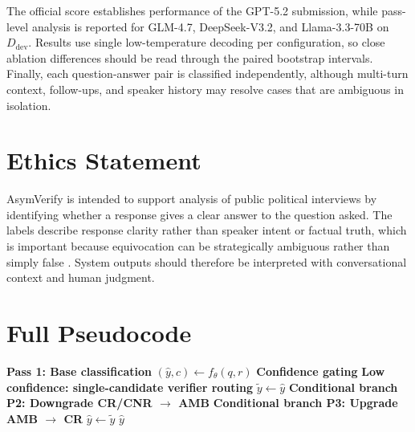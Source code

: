\documentclass[11pt]{article}
\newif\ifincludesupplement
\begin{document}
The official score establishes performance of the GPT-5.2 submission, while pass-level analysis is reported for GLM-4.7, DeepSeek-V3.2, and Llama-3.3-70B on $D_{\text{dev}}$. Results use single low-temperature decoding per configuration, so close ablation differences should be read through the paired bootstrap intervals. Finally, each question-answer pair is classified independently, although multi-turn context, follow-ups, and speaker history may resolve cases that are ambiguous in isolation.

\section*{Ethics Statement}

AsymVerify is intended to support analysis of public political interviews by identifying whether a response gives a clear answer to the question asked. The labels describe response clarity rather than speaker intent or factual truth, which is important because equivocation can be strategically ambiguous rather than simply false \citep{bavelas1990equivocal,clayman2001answers,clementson2018effects}. System outputs should therefore be interpreted with conversational context and human judgment.

\clearpage


\ifincludesupplement
\appendix
\onecolumn

\section{Full Pseudocode}
\label{app:algorithm}

\begin{algorithm}[h]
\small
{}

\textbf{Pass 1: Base classification}\;
$(\hat{y}, c) \gets f_\theta(q, r)$\;
\textbf{Confidence gating}\;
\textbf{Low confidence: single-candidate verifier routing}\;
$\tilde{y} \gets \hat{y}$\;
\textbf{Conditional branch P2: Downgrade CR/CNR $\to$ AMB}\;
\textbf{Conditional branch P3: Upgrade AMB $\to$ CR}\;
$\hat{y} \gets \tilde{y}$\;
\Return $\hat{y}$\;

\caption{\textsc{AsymVerify}. Parameters: $\tau{=}0.95$. The $D_{\text{dev}}$ call budget uses single-candidate routing, with maj@3 treated as a separate variant. P2 and P3 are conditional branches rather than unconditional sequential calls, and $g_\downarrow, g_\uparrow \in \{0,1\}$ are LLM verifiers.}
\label{alg:asymverify}
\end{algorithm}
\end{document}
